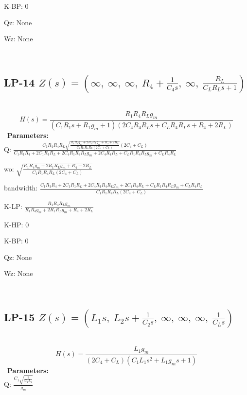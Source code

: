 \documentclass{article}
\begin{document}
K-BP: $0$\ 

Qz: $\text{None}$\ 

Wz: $\text{None}$\ 

\ 

\subsection{LP-14 $Z(s) = \left( \infty, \  \infty, \  \infty, \  R_{4} + \frac{1}{C_{4} s}, \  \infty, \  \frac{R_{L}}{C_{L} R_{L} s + 1}\right)$ } \ 
\textbf{\[H(s) = \frac{R_{1} R_{4} R_{L} g_{m}}{\left(C_{1} R_{1} s + R_{1} g_{m} + 1\right) \left(2 C_{4} R_{4} R_{L} s + C_{L} R_{4} R_{L} s + R_{4} + 2 R_{L}\right)}\] } \ 
\textbf{Parameters:}\\ 

Q: $\frac{C_{1} R_{1} R_{4} R_{L} \sqrt{\frac{R_{1} R_{4} g_{m} + 2 R_{1} R_{L} g_{m} + R_{4} + 2 R_{L}}{C_{1} R_{1} R_{4} R_{L} \left(2 C_{4} + C_{L}\right)}} \left(2 C_{4} + C_{L}\right)}{C_{1} R_{1} R_{4} + 2 C_{1} R_{1} R_{L} + 2 C_{4} R_{1} R_{4} R_{L} g_{m} + 2 C_{4} R_{4} R_{L} + C_{L} R_{1} R_{4} R_{L} g_{m} + C_{L} R_{4} R_{L}}$\ 

wo: $\sqrt{\frac{R_{1} R_{4} g_{m} + 2 R_{1} R_{L} g_{m} + R_{4} + 2 R_{L}}{C_{1} R_{1} R_{4} R_{L} \left(2 C_{4} + C_{L}\right)}}$\ 

bandwidth: $\frac{C_{1} R_{1} R_{4} + 2 C_{1} R_{1} R_{L} + 2 C_{4} R_{1} R_{4} R_{L} g_{m} + 2 C_{4} R_{4} R_{L} + C_{L} R_{1} R_{4} R_{L} g_{m} + C_{L} R_{4} R_{L}}{C_{1} R_{1} R_{4} R_{L} \left(2 C_{4} + C_{L}\right)}$\ 

K-LP: $\frac{R_{1} R_{4} R_{L} g_{m}}{R_{1} R_{4} g_{m} + 2 R_{1} R_{L} g_{m} + R_{4} + 2 R_{L}}$\ 

K-HP: $0$\ 

K-BP: $0$\ 

Qz: $\text{None}$\ 

Wz: $\text{None}$\ 

\ 

\subsection{LP-15 $Z(s) = \left( L_{1} s, \  L_{2} s + \frac{1}{C_{2} s}, \  \infty, \  \infty, \  \infty, \  \frac{1}{C_{L} s}\right)$ } \ 
\textbf{\[H(s) = \frac{L_{1} g_{m}}{\left(2 C_{4} + C_{L}\right) \left(C_{1} L_{1} s^{2} + L_{1} g_{m} s + 1\right)}\] } \ 
\textbf{Parameters:}\\ 

Q: $\frac{C_{1} \sqrt{\frac{1}{C_{1} L_{1}}}}{g_{m}}$\ 
\end{document}
